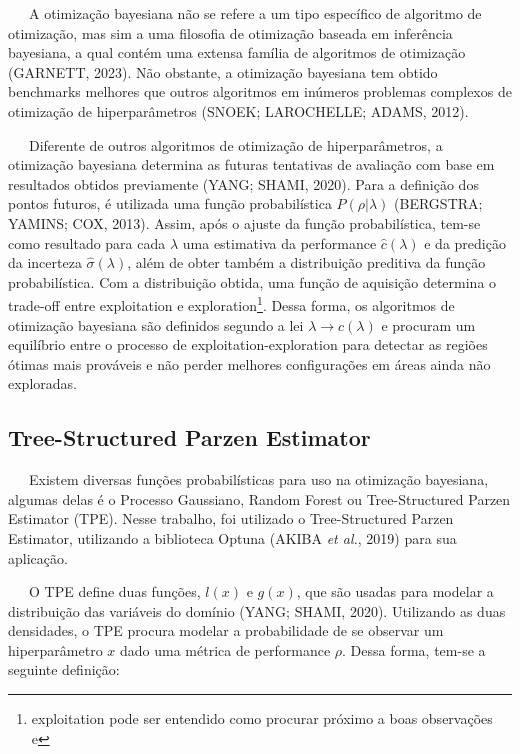 \documentclass[
  12pt,
  letterpaper,
  DIV=11,
  numbers=noendperiod]{scrreprt}
\begin{document}
\vspace{12pt}

~~~A otimização bayesiana não se refere a um tipo específico de
algoritmo de otimização, mas sim a uma filosofia de otimização baseada
em inferência bayesiana, a qual contém uma extensa família de algoritmos
de otimização (GARNETT, 2023). Não obstante, a otimização bayesiana tem
obtido benchmarks melhores que outros algoritmos em inúmeros problemas
complexos de otimização de hiperparâmetros (SNOEK; LAROCHELLE; ADAMS,
2012).

\vspace{12pt}

~~~Diferente de outros algoritmos de otimização de hiperparâmetros, a
otimização bayesiana determina as futuras tentativas de avaliação com
base em resultados obtidos previamente (YANG; SHAMI, 2020). Para a
definição dos pontos futuros, é utilizada uma função probabilística
\(P\left(\rho |  \lambda \right)\) (BERGSTRA; YAMINS; COX, 2013). Assim,
após o ajuste da função probabilística, tem-se como resultado para cada
\(\lambda\) uma estimativa da performance
\(\hat c \left(\lambda \right)\) e da predição da incerteza
\(\hat \sigma \left(\lambda \right)\), além de obter também a
distribuição preditiva da função probabilística. Com a distribuição
obtida, uma função de aquisição determina o trade-off entre exploitation
e exploration\footnote{exploitation pode ser entendido como procurar
  próximo a boas observações e}. Dessa forma, os algoritmos de
otimização bayesiana são definidos segundo a lei
\(\lambda \to c\left(\lambda \right)\) e procuram um equilíbrio entre o
processo de exploitation-exploration para detectar as regiões ótimas
mais prováveis e não perder melhores configurações em áreas ainda não
exploradas.

\subsection{Tree-Structured Parzen
Estimator}\label{tree-structured-parzen-estimator}

~~~Existem diversas funções probabilísticas para uso na otimização
bayesiana, algumas delas é o Processo Gaussiano, Random Forest ou
Tree-Structured Parzen Estimator (TPE). Nesse trabalho, foi utilizado o
Tree-Structured Parzen Estimator, utilizando a biblioteca Optuna (AKIBA
\emph{et al.}, 2019) para sua aplicação.

\vspace{12pt}

~~~O TPE define duas funções,
\(l\left(x\right) \text{ e } g\left(x\right)\), que são usadas para
modelar a distribuição das variáveis do domínio (YANG; SHAMI, 2020).
Utilizando as duas densidades, o TPE procura modelar a probabilidade de
se observar um hiperparâmetro \(x\) dado uma métrica de performance
\(\rho\). Dessa forma, tem-se a seguinte definição:
\end{document}
